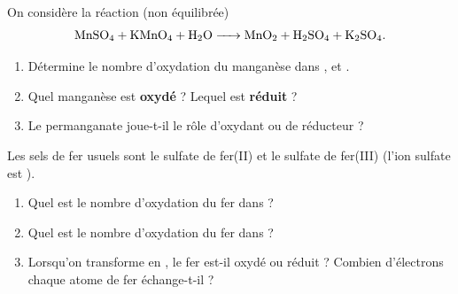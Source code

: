 \documentclass[11pt,a4paper]{article}
\begin{document}
\begin{exo}
On considère la réaction (non équilibrée)
\[
\ce{MnSO4 + KMnO4 + H2O -> MnO2 + H2SO4 + K2SO4}.
\]
\begin{enumerate}[label=\alph*)]
  \item Détermine le nombre d'oxydation du manganèse dans ,  et .
  \item Quel manganèse est \textbf{oxydé} ? Lequel est \textbf{réduit} ?
  \item Le permanganate  joue-t-il le rôle d'oxydant ou de réducteur ?
\end{enumerate}
\end{exo}

\begin{exo}
Les sels de fer usuels sont le sulfate de fer(II)  et le sulfate de fer(III)
 (l'ion sulfate est ).
\begin{enumerate}[label=\alph*)]
  \item Quel est le nombre d'oxydation du fer dans  ?
  \item Quel est le nombre d'oxydation du fer dans  ?
  \item Lorsqu'on transforme  en , le fer est-il oxydé ou réduit ? Combien
        d'électrons chaque atome de fer échange-t-il ?
\end{enumerate}
\end{exo}
\end{document}
